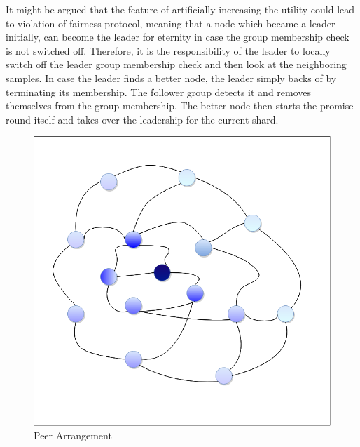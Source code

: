 \documentclass[12pt,a4paper,twoside,openright]{book}
\begin{document}
\par It might be argued that the feature of artificially increasing the utility could lead to violation of fairness protocol, meaning that a node which became a leader initially, can become the leader for eternity in case the group membership check is not switched off. Therefore, it is the responsibility of the leader to locally switch off the leader group membership check and then look at the neighboring samples. In case the leader finds a better node, the leader simply backs of by terminating its membership. The follower group detects it and removes themselves from the group membership. The better node then starts the promise round itself and takes over the leadership for the current shard.

\begin{figure}[h]
	\includegraphics[scale=0.5]{p2p}
	\centering
	\caption{Peer Arrangement}
	\label{fig:p-arrange}
\end{figure}
\end{document}
